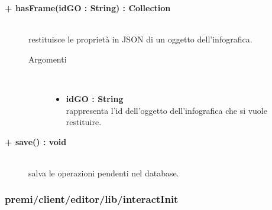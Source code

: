 \begin{description}
\begin{description}
\begin{description}
\end{description}

\end{description}

\begin{description}
		\item[\textbf{\color{blue}+ hasFrame(idGO : String) : Collection			}] \hfill \\
			restituisce le proprietà in JSON di un oggetto dell'infografica.     

\begin{description}
			\item[Argomenti] \hfill \\
				\begin{itemize}
					\item \textbf{idGO : String			} \hfill \\
					rappresenta l'id dell'oggetto dell'infografica che si vuole restituire. 
				\end{itemize}

\end{description}

\end{description}

\begin{description} %
		\item[\textbf{\color{blue}+ save() : void			}] \hfill \\
			salva le operazioni pendenti nel database.

\end{description}



\end{description}


\subsubsection{premi/client/editor/lib/interactInit}


